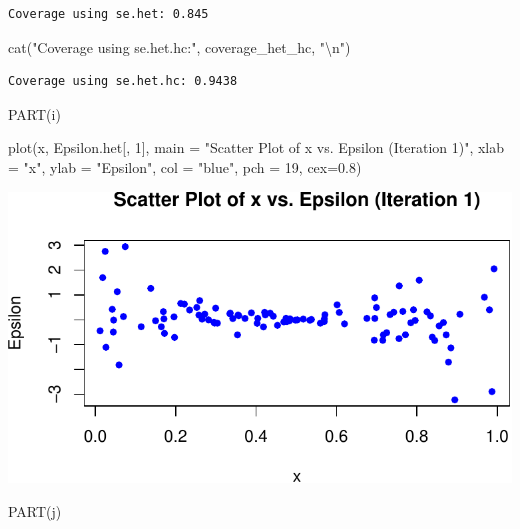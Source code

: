 \documentclass[
  11pt,
]{article}
\newenvironment{Shaded}{\begin{snugshade}}{\end{snugshade}}
\newcommand{\AttributeTok}[1]{\textcolor[rgb]{0.40,0.45,0.13}{#1}}
\newcommand{\DecValTok}[1]{\textcolor[rgb]{0.68,0.00,0.00}{#1}}
\newcommand{\FloatTok}[1]{\textcolor[rgb]{0.68,0.00,0.00}{#1}}
\newcommand{\FunctionTok}[1]{\textcolor[rgb]{0.28,0.35,0.67}{#1}}
\newcommand{\NormalTok}[1]{\textcolor[rgb]{0.00,0.23,0.31}{#1}}
\newcommand{\SpecialCharTok}[1]{\textcolor[rgb]{0.37,0.37,0.37}{#1}}
\newcommand{\StringTok}[1]{\textcolor[rgb]{0.13,0.47,0.30}{#1}}
\begin{document}
\begin{verbatim}
Coverage using se.het: 0.845 
\end{verbatim}

\begin{Shaded}
\begin{Highlighting}[]
\FunctionTok{cat}\NormalTok{(}\StringTok{"Coverage using se.het.hc:"}\NormalTok{, coverage\_het\_hc, }\StringTok{"}\SpecialCharTok{\textbackslash{}n}\StringTok{"}\NormalTok{)}
\end{Highlighting}
\end{Shaded}

\begin{verbatim}
Coverage using se.het.hc: 0.9438 
\end{verbatim}

PART(i)

\begin{Shaded}
\begin{Highlighting}[]
\FunctionTok{plot}\NormalTok{(x, Epsilon.het[, }\DecValTok{1}\NormalTok{], }\AttributeTok{main =} \StringTok{"Scatter Plot of x vs. Epsilon (Iteration 1)"}\NormalTok{, }\AttributeTok{xlab =} \StringTok{"x"}\NormalTok{, }\AttributeTok{ylab =} \StringTok{"Epsilon"}\NormalTok{, }\AttributeTok{col =} \StringTok{"blue"}\NormalTok{, }\AttributeTok{pch =} \DecValTok{19}\NormalTok{, }\AttributeTok{cex=}\FloatTok{0.8}\NormalTok{)}
\end{Highlighting}
\end{Shaded}

\includegraphics{HW-4-CODE-and-ANSWERS_files/figure-pdf/unnamed-chunk-18-1.pdf}

PART(j)
\end{document}
